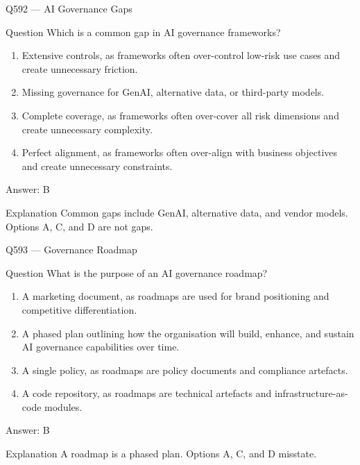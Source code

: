 \documentclass[aspectratio=169,8pt]{beamer}
\begin{document}
	\begin{frame}{Q592 --- AI Governance Gaps}
		\begin{block}{Question}
			Which is a common gap in AI governance frameworks?
			\begin{enumerate}
				\item Extensive controls, as frameworks often over-control low-risk use cases and create unnecessary friction.
				\item Missing governance for GenAI, alternative data, or third-party models.
				\item Complete coverage, as frameworks often over-cover all risk dimensions and create unnecessary complexity.
				\item Perfect alignment, as frameworks often over-align with business objectives and create unnecessary constraints.
			\end{enumerate}
		\end{block}
		\begin{exampleblock}{Answer: B}\end{exampleblock}
		\begin{block}{Explanation}
			Common gaps include GenAI, alternative data, and vendor models. Options A, C, and D are not gaps.
		\end{block}
	\end{frame}
	
	\begin{frame}{Q593 --- Governance Roadmap}
		\begin{block}{Question}
			What is the purpose of an AI governance roadmap?
			\begin{enumerate}
				\item A marketing document, as roadmaps are used for brand positioning and competitive differentiation.
				\item A phased plan outlining how the organisation will build, enhance, and sustain AI governance capabilities over time.
				\item A single policy, as roadmaps are policy documents and compliance artefacts.
				\item A code repository, as roadmaps are technical artefacts and infrastructure-as-code modules.
			\end{enumerate}
		\end{block}
		\begin{exampleblock}{Answer: B}\end{exampleblock}
		\begin{block}{Explanation}
			A roadmap is a phased plan. Options A, C, and D misstate.
		\end{block}
	\end{frame}
	
\end{document}
